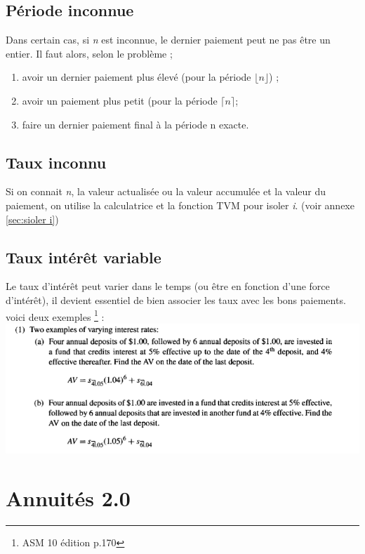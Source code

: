\documentclass[11pt,french]{report}
\begin{document}
\section{Période inconnue}
\label{période inconnue}

Dans certain cas, si \textit{n} est inconnue, le dernier paiement peut ne pas être un entier. Il faut alors, selon le problème ; 
\begin{enumerate}
\item avoir un dernier paiement plus élevé (pour la période $\lfloor n \rfloor$) ;
\item avoir un paiement plus petit (pour la période $\lceil n \rceil$;
\item faire un dernier paiement final à la période n exacte.
\end{enumerate}

\section{Taux inconnu}
\label{taux inconnu}

Si on connait \textit{n}, la valeur actualisée ou la valeur accumulée et la valeur du paiement, on utilise la calculatrice et la fonction TVM pour isoler \textit{i}. (voir annexe \ref{sec:sioler i})

\section{Taux intérêt variable}
\label{Taux intérêt variable et annuité}

Le taux d'intérêt peut varier dans le temps (ou être en fonction d'une force d'intérêt), il devient essentiel de bien associer les taux avec les bons paiements. voici deux exemples \footnote{ASM 10 \ieme édition p.170} :
\\
\includegraphics[scale=0.80]{picture4.PNG}



\chapter{Annuités 2.0}
\label{Annuités 2.0}
\end{document}
